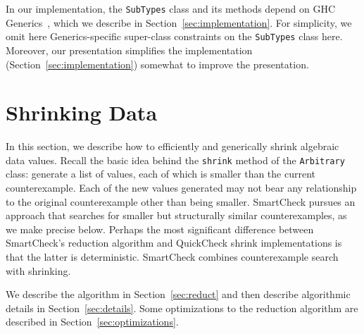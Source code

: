 \documentclass{sigplanconf}
\newcommand{\ttp}[1]{\texttt{#1}}
\begin{document}
In our implementation, the \ttp{SubTypes} class and its methods depend on GHC
Generics~\cite{generics}, which we describe in Section~\ref{sec:implementation}.
For simplicity, we omit here Generics-specific super-class constraints on the
\ttp{SubTypes} class here.  Moreover, our presentation simplifies the
implementation (Section~\ref{sec:implementation}) somewhat to improve the
presentation.



\section{Shrinking Data}\label{sec:shrinking}
In this section, we describe how to efficiently and generically shrink algebraic
data values.  Recall the basic idea behind the \ttp{shrink} method of the
\ttp{Arbitrary} class: generate a list of values, each of which is smaller than
the current counterexample.  Each of the new values generated may not bear any
relationship to the original counterexample other than being smaller.
SmartCheck pursues an approach that searches for smaller but structurally
similar counterexamples, as we make precise below.  Perhaps the most significant
difference between SmartCheck's reduction algorithm and QuickCheck shrink
implementations is that the latter is deterministic.  SmartCheck combines
counterexample search with shrinking.

We describe the algorithm in Section~\ref{sec:reduct} and then describe
algorithmic details in Section~\ref{sec:details}.  Some optimizations to the
reduction algorithm are described in Section~\ref{sec:optimizations}.


\end{document}
